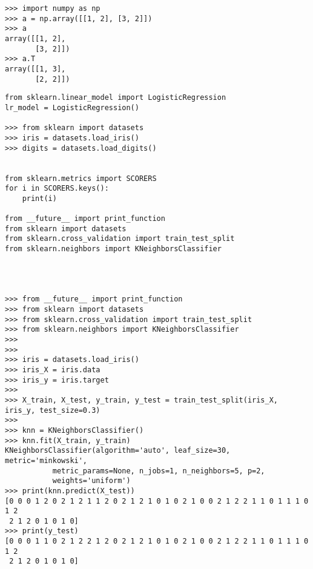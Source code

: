 \begin{verbatim}
>>> import numpy as np
>>> a = np.array([[1, 2], [3, 2]])
>>> a
array([[1, 2],
       [3, 2]])
>>> a.T
array([[1, 3],
       [2, 2]])
\end{verbatim}


\begin{verbatim}
from sklearn.linear_model import LogisticRegression
lr_model = LogisticRegression()

>>> from sklearn import datasets
>>> iris = datasets.load_iris()
>>> digits = datasets.load_digits()


from sklearn.metrics import SCORERS
for i in SCORERS.keys():
    print(i)

from __future__ import print_function
from sklearn import datasets
from sklearn.cross_validation import train_test_split
from sklearn.neighbors import KNeighborsClassifier




>>> from __future__ import print_function
>>> from sklearn import datasets
>>> from sklearn.cross_validation import train_test_split
>>> from sklearn.neighbors import KNeighborsClassifier
>>> 
>>> 
>>> iris = datasets.load_iris()
>>> iris_X = iris.data
>>> iris_y = iris.target
>>> 
>>> X_train, X_test, y_train, y_test = train_test_split(iris_X, iris_y, test_size=0.3)
>>> 
>>> knn = KNeighborsClassifier()
>>> knn.fit(X_train, y_train)
KNeighborsClassifier(algorithm='auto', leaf_size=30, metric='minkowski',
           metric_params=None, n_jobs=1, n_neighbors=5, p=2,
           weights='uniform')
>>> print(knn.predict(X_test))
[0 0 0 1 2 0 2 1 2 1 1 2 0 2 1 2 1 0 1 0 2 1 0 0 2 1 2 2 1 1 0 1 1 1 0 1 2
 2 1 2 0 1 0 1 0]
>>> print(y_test)
[0 0 0 1 1 0 2 1 2 2 1 2 0 2 1 2 1 0 1 0 2 1 0 0 2 1 2 2 1 1 0 1 1 1 0 1 2
 2 1 2 0 1 0 1 0]
\end{verbatim}

\ifx\engineeringnotes\undefined
    
\fi
